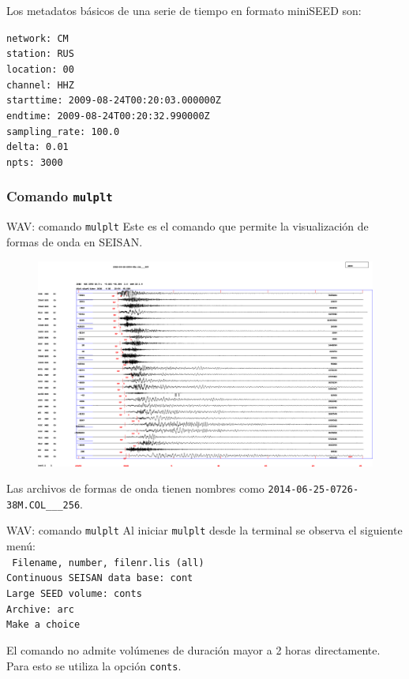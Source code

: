 \documentclass[11pt]{beamer}
\begin{document}
\begin{frame}
Los metadatos básicos de una serie de tiempo en formato miniSEED son:
\begin{center}
{\tt       network: CM\\
         station: RUS\\
        location: 00\\
         channel: HHZ\\
       starttime: 2009-08-24T00:20:03.000000Z\\
         endtime: 2009-08-24T00:20:32.990000Z\\
   sampling\_rate: 100.0\\
              delta: 0.01\\
            npts: 3000\\}
\end{center}
\end{frame}


\subsubsection{Comando {\tt mulplt}}
\begin{frame}{WAV: comando {\tt mulplt}}
Este es el comando que permite la visualización de formas de onda en SEISAN.
\begin{figure}
\includegraphics[scale=0.13]{traza.png}
\end{figure}

Las archivos de formas de onda tienen nombres como {\tt 2014-06-25-0726-38M.COL\_\_\_256}.
\end{frame}

\begin{frame}{WAV: comando {\tt mulplt}}
Al iniciar {\tt mulplt} desde la terminal se observa el siguiente menú:\\
{\tt 
Filename, number, filenr.lis (all)\\
  Continuous SEISAN data base: cont\\ 
  Large SEED volume: conts\\
  Archive: arc\\
  Make a choice\\
} 

El comando no admite volúmenes de duración mayor a 2 horas directamente. Para esto se utiliza la opción {\tt conts}.
\end{frame}
\end{document}
